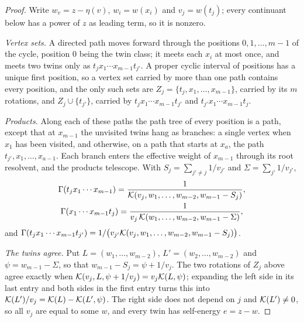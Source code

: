 \begin{proof}
Write $w_v=z-\eta(v)$, $w_i=w(x_i)$ and $v_j=w(t_j)$; every continuant below has a power of $z$ as leading term, so it is nonzero.

\emph{Vertex sets.} A directed path moves forward through the positions $0,1,\dots,m-1$ of the cycle, position $0$ being the twin class; it meets each $x_i$ at most once, and meets two twins only as $t_jx_1\cdots x_{m-1}t_{j'}$. A proper cyclic interval of positions has a unique first position, so a vertex set carried by more than one path contains every position, and the only such sets are $Z_j=\{t_j,x_1,\dots,x_{m-1}\}$, carried by its $m$ rotations, and $Z_j\cup\{t_{j'}\}$, carried by $t_jx_1\cdots x_{m-1}t_{j'}$ and $t_{j'}x_1\cdots x_{m-1}t_j$.

\emph{Products.} Along each of these paths the path tree of every position is a path, except that at $x_{m-1}$ the unvisited twins hang as branches: a single vertex when $x_1$ has been visited, and otherwise, on a path that starts at $x_a$, the path $t_{j'},x_1,\dots,x_{a-1}$. Each branch enters the effective weight of $x_{m-1}$ through its root resolvent, and the products telescope. With $S_j=\sum_{j'\neq j}1/v_{j'}$ and $\Sigma=\sum_{j'}1/v_{j'}$,
\begin{gather*}
\Gamma(t_jx_1\cdots x_{m-1})=\frac{1}{\mathcal{K}(v_j,w_1,\dots,w_{m-2},w_{m-1}-S_j)},\\
\Gamma(x_1\cdots x_{m-1}t_j)=\frac{1}{v_j\,\mathcal{K}(w_1,\dots,w_{m-2},w_{m-1}-\Sigma)},
\end{gather*}
and $\Gamma(t_jx_1\cdots x_{m-1}t_{j'})=1/\bigl(v_{j'}\mathcal{K}(v_j,w_1,\dots,w_{m-2},w_{m-1}-S_j)\bigr)$.

\emph{The twins agree.} Put $L=(w_1,\dots,w_{m-2})$, $L'=(w_2,\dots,w_{m-2})$ and $\psi=w_{m-1}-\Sigma$, so that $w_{m-1}-S_j=\psi+1/v_j$. The two rotations of $Z_j$ above agree exactly when $\mathcal{K}(v_j,L,\psi+1/v_j)=v_j\mathcal{K}(L,\psi)$; expanding the left side in its last entry and both sides in the first entry turns this into $\mathcal{K}(L')/v_j=\mathcal{K}(L)-\mathcal{K}(L',\psi)$. The right side does not depend on $j$ and $\mathcal{K}(L')\neq0$, so all $v_j$ are equal to some $w$, and every twin has self-energy $e=z-w$.


\end{proof}
